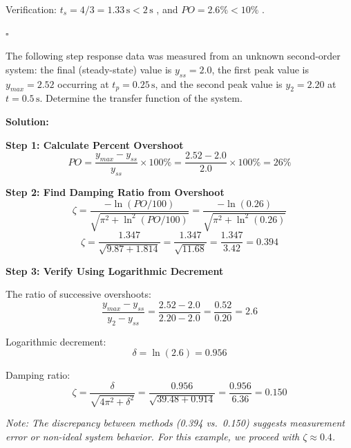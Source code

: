 Verification: $t_s = 4/3 = 1.33\,\text{s} < 2\,\text{s}$ \checkmark, and $PO = 2.6\% < 10\%$ \checkmark.

\hfill$\square$

\begin{example}
\label{ex:sysid}
The following step response data was measured from an unknown second-order system: the final (steady-state) value is $y_{ss} = 2.0$, the first peak value is $y_{max} = 2.52$ occurring at $t_p = 0.25\,\text{s}$, and the second peak value is $y_2 = 2.20$ at $t = 0.5\,\text{s}$. Determine the transfer function of the system.
\end{example}

\textbf{Solution:}

\textbf{Step 1: Calculate Percent Overshoot}
\begin{equation}
PO = \frac{y_{max} - y_{ss}}{y_{ss}} \times 100\% = \frac{2.52 - 2.0}{2.0} \times 100\% = 26\%
\end{equation}

\textbf{Step 2: Find Damping Ratio from Overshoot}
\begin{equation}
\zeta = \frac{-\ln(PO/100)}{\sqrt{\pi^2 + \ln^2(PO/100)}} = \frac{-\ln(0.26)}{\sqrt{\pi^2 + \ln^2(0.26)}}
\end{equation}
\begin{equation}
\zeta = \frac{1.347}{\sqrt{9.87 + 1.814}} = \frac{1.347}{\sqrt{11.68}} = \frac{1.347}{3.42} = 0.394
\end{equation}

\textbf{Step 3: Verify Using Logarithmic Decrement}

The ratio of successive overshoots:
\begin{equation}
\frac{y_{max} - y_{ss}}{y_2 - y_{ss}} = \frac{2.52 - 2.0}{2.20 - 2.0} = \frac{0.52}{0.20} = 2.6
\end{equation}

Logarithmic decrement:
\begin{equation}
\delta = \ln(2.6) = 0.956
\end{equation}

Damping ratio:
\begin{equation}
\zeta = \frac{\delta}{\sqrt{4\pi^2 + \delta^2}} = \frac{0.956}{\sqrt{39.48 + 0.914}} = \frac{0.956}{6.36} = 0.150
\end{equation}

\textit{Note: The discrepancy between methods (0.394 vs.\ 0.150) suggests measurement error or non-ideal system behavior. For this example, we proceed with $\zeta \approx 0.4$.}

